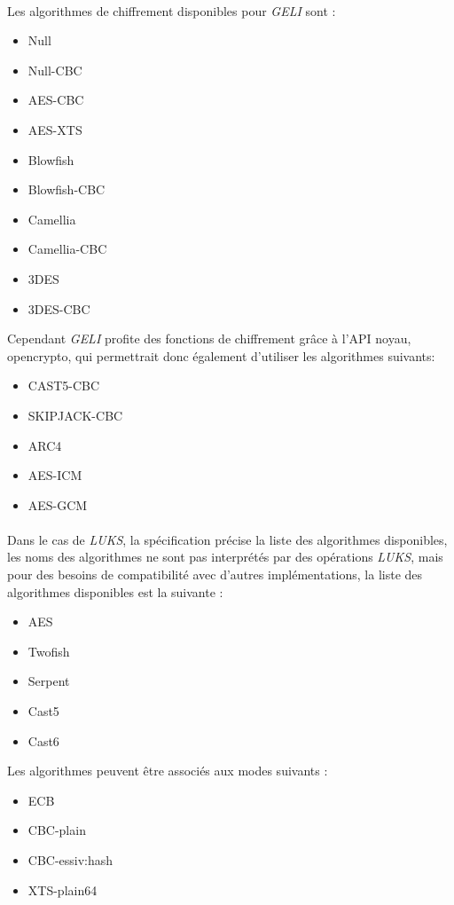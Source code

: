 \paragraph{}
Les algorithmes de chiffrement disponibles pour {\em GELI} \cite{geli.h} sont :
\begin{itemize}
	\item Null
	\item Null-CBC
	\item AES-CBC
	\item AES-XTS
	\item Blowfish
	\item Blowfish-CBC
	\item Camellia
	\item Camellia-CBC
	\item 3DES
	\item 3DES-CBC
\end{itemize}

Cependant {\em GELI} profite des fonctions de chiffrement grâce à l'API noyau,
opencrypto, qui permettrait donc également d'utiliser les algorithmes suivants:
\begin{itemize}
	\item{CAST5-CBC}
	\item{SKIPJACK-CBC}
	\item{ARC4}
	\item{AES-ICM}
	\item{AES-GCM}
\end{itemize}

\paragraph{}
Dans le cas de {\em LUKS}, la spécification \cite{onDiskFormatLuks} précise
la liste des algorithmes disponibles, les noms des algorithmes ne sont pas 
interprétés par des opérations {\em LUKS}, mais pour des besoins de 
compatibilité avec d'autres implémentations, la liste des algorithmes 
disponibles est la suivante :
\begin{itemize}
	\item AES
	\item Twofish
	\item Serpent
	\item Cast5
	\item Cast6
\end{itemize}
Les algorithmes peuvent être associés aux modes suivants :
\begin{itemize}
	\item ECB
	\item CBC-plain
	\item CBC-essiv:hash
	\item XTS-plain64
\end{itemize}

